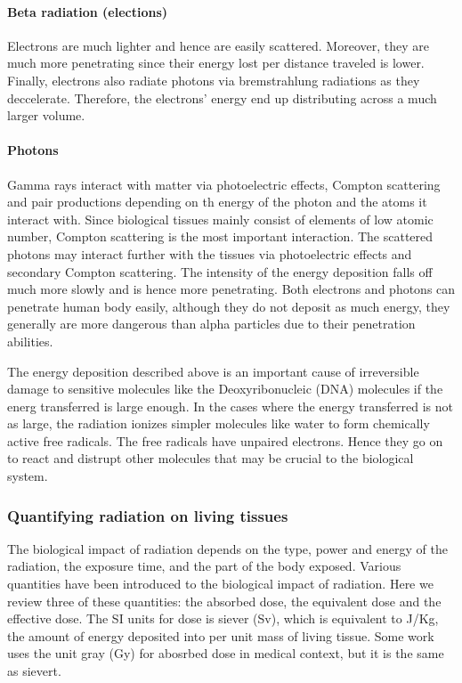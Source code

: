 \documentclass[nofootinbib,preprint,aps]{revtex4-1}
\begin{document}
        \paragraph{Beta radiation (elections)} Electrons are much lighter and hence are easily scattered.
        Moreover, they are much more penetrating since their energy lost per distance traveled is lower.
        Finally, electrons also radiate photons
        via bremstrahlung radiations as they deccelerate. Therefore, the electrons' energy end up distributing
        across a much larger volume.
        \paragraph{Photons} Gamma rays interact with matter via photoelectric effects, Compton scattering and pair productions
        depending on th energy of the photon and the atoms it interact with.
        Since biological tissues mainly consist of elements of low atomic number, Compton
        scattering is the most important interaction. The scattered photons may interact further with the tissues
        via photoelectric effects and secondary Compton scattering. The intensity of the energy deposition falls
        off much more slowly and is hence more penetrating. Both electrons and photons can penetrate human body easily,
        although they do not deposit as much energy, they generally are more dangerous than alpha particles due to their
        penetration abilities.

        The energy deposition described above is an important cause of irreversible damage to sensitive molecules
        like the Deoxyribonucleic (DNA) molecules if the energ transferred is large enough.
        In the cases where the energy transferred is not as large, the radiation ionizes simpler molecules like water
        to form chemically active free radicals. The free radicals have unpaired electrons. Hence they go on to react and distrupt
        other molecules that may be crucial to the biological system.


        \subsubsection{Quantifying radiation on living tissues}
        The biological impact of radiation depends on the type, power and energy of the radiation, the
        exposure time, and the part of the body exposed. Various quantities have been introduced to
        the biological impact of radiation. Here we review three
        of these quantities: the absorbed dose, the equivalent dose and the effective dose.
        The SI units for dose is siever (Sv), which is equivalent to J/Kg, the amount of energy deposited into
        per unit mass of living tissue. Some work uses the unit gray (Gy) for abosrbed dose in medical context,
        but it is the same as sievert.
\end{document}
